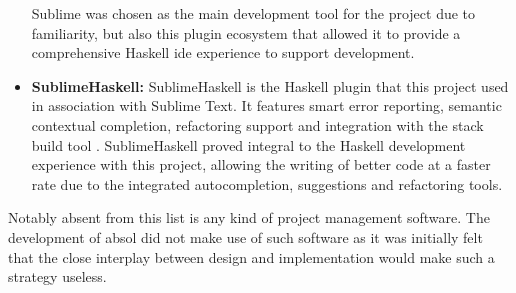 \begin{itemize}
    Sublime was chosen as the main development tool for the project due to familiarity, but also this plugin ecosystem that allowed it to provide a comprehensive Haskell \gls{ide} experience to support development.
    \item \textbf{SublimeHaskell:} SublimeHaskell is the Haskell plugin that this project used in association with Sublime Text. 
    It features smart error reporting, semantic contextual completion, refactoring support and integration with the stack build tool \citep{sublime_haskell}. 
    SublimeHaskell proved integral to the Haskell development experience with this project, allowing the writing of better code at a faster rate due to the integrated autocompletion, suggestions and refactoring tools. 
\end{itemize}

Notably absent from this list is any kind of project management software.
The development of \gls{absol} did not make use of such software as it was initially felt that the close interplay between design and implementation would make such a strategy useless.

